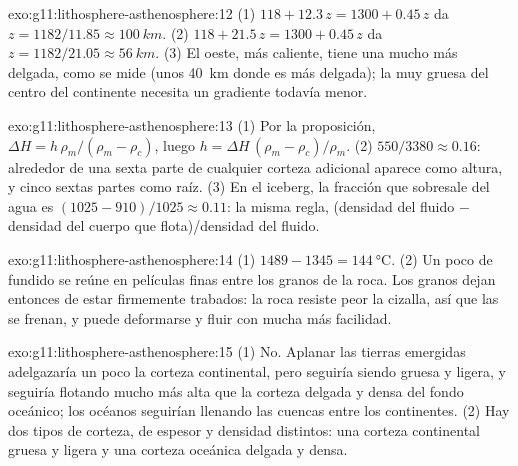 \begin{solution}{exo:g11:lithosphere-asthenosphere:12}
(1) $118 + 12.3\,z = 1300 + 0.45\,z$ da $z = 1182/11.85 \approx
\qty{100}{km}$. (2) $118 + 21.5\,z = 1300 + 0.45\,z$ da $z = 1182/21.05
\approx \qty{56}{km}$. (3) El oeste, más caliente, tiene una  mucho
más delgada, como se mide (unos \qty{40}{km} donde es más delgada); la
 muy gruesa del centro del continente necesita un gradiente todavía
menor.
\end{solution}

\begin{solution}{exo:g11:lithosphere-asthenosphere:13}
(1) Por la proposición, $\Delta H = h\,\rho_m/(\rho_m - \rho_c)$, luego $h =
\Delta H\,(\rho_m - \rho_c)/\rho_m$. (2) $550/3380 \approx 0.16$: alrededor de
una sexta parte de cualquier corteza adicional aparece como altura, y cinco
sextas partes como raíz. (3) En el iceberg, la fracción que sobresale del
agua es $(1025 - 910)/1025 \approx 0.11$: la misma regla, (densidad del
fluido $-$ densidad del cuerpo que flota)/densidad del fluido.
\end{solution}

\begin{solution}{exo:g11:lithosphere-asthenosphere:14}
(1) $1489 - 1345 = \qty{144}{\celsius}$. (2) Un poco de fundido se reúne en
películas finas entre los granos de la roca. Los granos dejan entonces de
estar firmemente trabados: la roca resiste peor la cizalla, así que las  se frenan, y puede deformarse y fluir con mucha más facilidad.
\end{solution}

\begin{solution}{exo:g11:lithosphere-asthenosphere:15}
(1) No. Aplanar las tierras emergidas adelgazaría un poco la corteza
continental, pero seguiría siendo gruesa y ligera, y seguiría flotando mucho
más alta que la corteza delgada y densa del fondo oceánico; los océanos
seguirían llenando las cuencas entre los continentes. (2) Hay dos tipos de
corteza, de espesor y densidad distintos: una corteza continental gruesa y
ligera y una corteza oceánica delgada y densa.
\end{solution}

